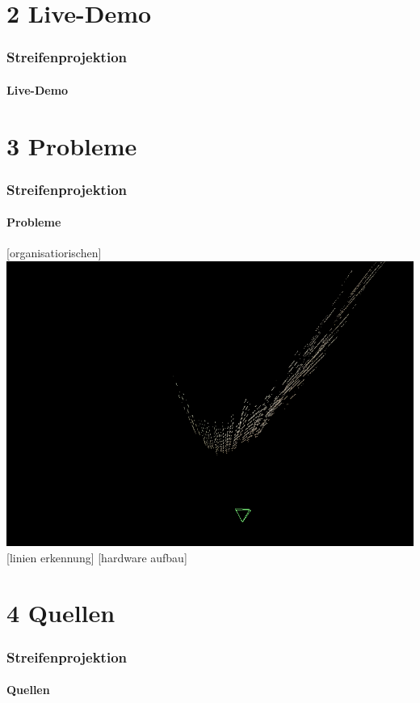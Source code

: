 \documentclass{beamer}
\begin{document}
\section{2 \hspace{5px} Live-Demo} 
\begin{frame}
	\frametitle{Streifenprojektion}
	\framesubtitle{Live-Demo}
	
\end{frame}


\section{3 \hspace{5px} Probleme} 
\begin{frame}
	\frametitle{Streifenprojektion}
	\framesubtitle{Probleme}
	[organisatiorischen]
	\includegraphics[width=\linewidth]{includes/krumm.png}
	[linien erkennung]
	[hardware aufbau]
	
	
\end{frame}

\section{4 \hspace{5px} Quellen} 
\begin{frame}
	\frametitle{Streifenprojektion}
	\framesubtitle{Quellen}
	
\end{frame}
\end{document}
